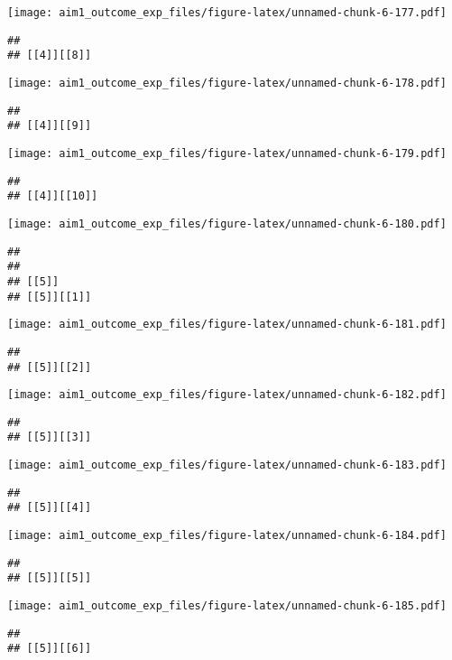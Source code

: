\documentclass[
]{article}
\begin{document}
\texttt{[image: aim1\_outcome\_exp\_files/figure-latex/unnamed-chunk-6-177.pdf]}

\begin{verbatim}
## 
## [[4]][[8]]
\end{verbatim}

\texttt{[image: aim1\_outcome\_exp\_files/figure-latex/unnamed-chunk-6-178.pdf]}

\begin{verbatim}
## 
## [[4]][[9]]
\end{verbatim}

\texttt{[image: aim1\_outcome\_exp\_files/figure-latex/unnamed-chunk-6-179.pdf]}

\begin{verbatim}
## 
## [[4]][[10]]
\end{verbatim}

\texttt{[image: aim1\_outcome\_exp\_files/figure-latex/unnamed-chunk-6-180.pdf]}

\begin{verbatim}
## 
## 
## [[5]]
## [[5]][[1]]
\end{verbatim}

\texttt{[image: aim1\_outcome\_exp\_files/figure-latex/unnamed-chunk-6-181.pdf]}

\begin{verbatim}
## 
## [[5]][[2]]
\end{verbatim}

\texttt{[image: aim1\_outcome\_exp\_files/figure-latex/unnamed-chunk-6-182.pdf]}

\begin{verbatim}
## 
## [[5]][[3]]
\end{verbatim}

\texttt{[image: aim1\_outcome\_exp\_files/figure-latex/unnamed-chunk-6-183.pdf]}

\begin{verbatim}
## 
## [[5]][[4]]
\end{verbatim}

\texttt{[image: aim1\_outcome\_exp\_files/figure-latex/unnamed-chunk-6-184.pdf]}

\begin{verbatim}
## 
## [[5]][[5]]
\end{verbatim}

\texttt{[image: aim1\_outcome\_exp\_files/figure-latex/unnamed-chunk-6-185.pdf]}

\begin{verbatim}
## 
## [[5]][[6]]
\end{verbatim}
\end{document}
